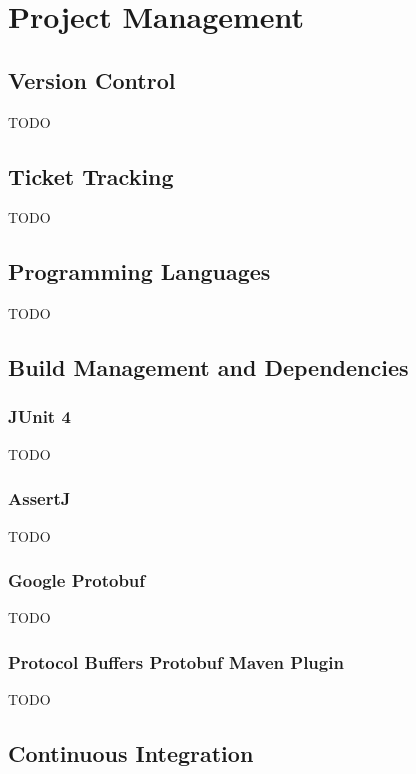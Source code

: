 \section{Project Management}

\subsection{Version Control}

TODO

\subsection{Ticket Tracking}

TODO

\subsection{Programming Languages}

TODO

\subsection{Build Management and Dependencies}

\subsubsection{JUnit 4}

TODO

\subsubsection{AssertJ}

TODO

\subsubsection{Google Protobuf}

TODO

\subsubsection{Protocol Buffers Protobuf Maven Plugin}

TODO

\subsection{Continuous Integration}

